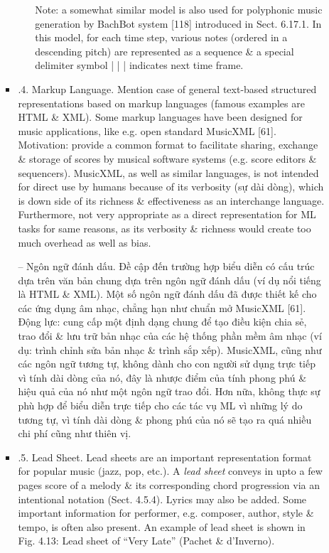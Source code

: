 \documentclass{article}
\begin{document}
\begin{itemize}
\begin{itemize}
\begin{itemize}
\begin{itemize}
				Note: a somewhat similar model is also used for polyphonic music generation by BachBot system [118] introduced in Sect. 6.17.1. In this model, for each time step, various notes (ordered in a descending pitch) are represented as a sequence \& a special delimiter symbol | | | indicates next time frame.
			\end{itemize}
			\item {.4. Markup Language.} Mention case of general text-based structured representations based on markup languages (famous examples are HTML \& XML). Some markup languages have been designed for music applications, like e.g. open standard MusicXML [61]. Motivation: provide a common format to facilitate sharing, exchange \& storage of scores by musical software systems (e.g. score editors \& sequencers). MusicXML, as well as similar languages, is not intended for direct use by humans because of its verbosity (sự dài dòng), which is down side of its richness \& effectiveness as an interchange language. Furthermore, not very appropriate as a direct representation for ML tasks for same reasons, as its verbosity \& richness would create too much overhead as well as bias.
			
			-- Ngôn ngữ đánh dấu. Đề cập đến trường hợp biểu diễn có cấu trúc dựa trên văn bản chung dựa trên ngôn ngữ đánh dấu (ví dụ nổi tiếng là HTML \& XML). Một số ngôn ngữ đánh dấu đã được thiết kế cho các ứng dụng âm nhạc, chẳng hạn như chuẩn mở MusicXML [61]. Động lực: cung cấp một định dạng chung để tạo điều kiện chia sẻ, trao đổi \& lưu trữ bản nhạc của các hệ thống phần mềm âm nhạc (ví dụ: trình chỉnh sửa bản nhạc \& trình sắp xếp). MusicXML, cũng như các ngôn ngữ tương tự, không dành cho con người sử dụng trực tiếp vì tính dài dòng của nó, đây là nhược điểm của tính phong phú \& hiệu quả của nó như một ngôn ngữ trao đổi. Hơn nữa, không thực sự phù hợp để biểu diễn trực tiếp cho các tác vụ ML vì những lý do tương tự, vì tính dài dòng \& phong phú của nó sẽ tạo ra quá nhiều chi phí cũng như thiên vị.
			\item {.5. Lead Sheet.} Lead sheets are an important representation format for popular music (jazz, pop, etc.). A {\it lead sheet} conveys in upto a few pages score of a melody \& its corresponding chord progression via an intentional notation (Sect. 4.5.4). Lyrics may also be added. Some important information for performer, e.g. composer, author, style \& tempo, is often also present. An example of lead sheet is shown in {\sf Fig. 4.13: Lead sheet of ``Very Late'' (Pachet \& d'Inverno).}
			

\end{itemize}
\end{itemize}
\end{itemize}
\end{document}
